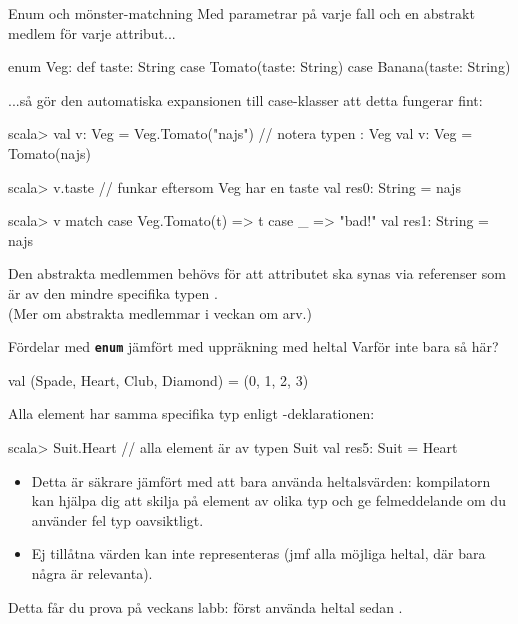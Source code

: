 \begin{Slide}{Enum och mönster-matchning}
\SlideFontSmall
Med parametrar på varje fall och en abstrakt medlem för varje attribut... 
\begin{Code}
enum Veg:
  def taste: String
  case Tomato(taste: String)
  case Banana(taste: String)
\end{Code}
...så gör den automatiska expansionen till case-klasser att detta fungerar fint: 
\begin{REPLsmall}
scala> val v: Veg = Veg.Tomato("najs") // notera typen : Veg
val v: Veg = Tomato(najs)

scala> v.taste  // funkar eftersom Veg har en taste
val res0: String = najs

scala> v match { case Veg.Tomato(t) => t case _ => "bad!" }
val res1: String = najs
\end{REPLsmall}
Den abstrakta medlemmen  behövs för att attributet ska synas via referenser som är av den mindre specifika typen .\\(Mer om abstrakta medlemmar i veckan om arv.)

\end{Slide}


\begin{Slide}{Fördelar med \texttt{\textbf{enum}} jämfört med uppräkning med heltal}
Varför inte bara så här?
\begin{Code}
val (Spade, Heart, Club, Diamond) = (0, 1, 2, 3)  
\end{Code}  
Alla element har samma specifika typ enligt -deklarationen:  
\begin{REPL}
scala> Suit.Heart              // alla element är av typen Suit 
val res5: Suit = Heart
\end{REPL}

\begin{itemize}
\item Detta är säkrare jämfört med att bara använda heltalsvärden: kompilatorn kan hjälpa dig att skilja på element av olika typ och ge felmeddelande om du använder fel typ oavsiktligt. 
\item Ej tillåtna värden kan inte representeras (jmf alla möjliga heltal, där bara några är relevanta).
\end{itemize}  
Detta får du prova på veckans labb: först använda heltal sedan .
\end{Slide}